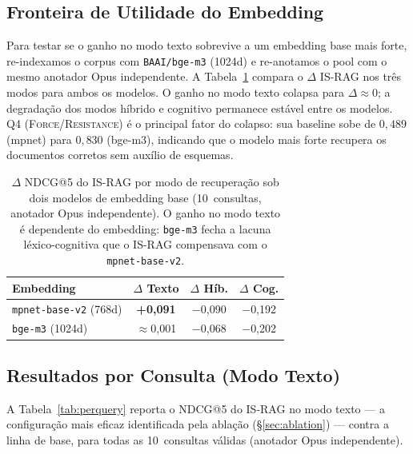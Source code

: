 \documentclass[11pt,a4paper]{article}
\begin{document}
\subsection{Fronteira de Utilidade do Embedding}
\label{sec:embedding}

Para testar se o ganho no modo texto sobrevive a um embedding base mais
forte, re-indexamos o corpus com \texttt{BAAI/bge-m3} (1024d) e
re-anotamos o pool com o mesmo anotador Opus independente.
A Tabela~\ref{tab:embedding} compara o $\Delta$ IS-RAG nos três modos
para ambos os modelos.
O ganho no modo texto colapsa para $\Delta \approx 0$; a degradação dos
modos híbrido e cognitivo permanece estável entre os modelos.
Q4 (\textsc{Force}/\textsc{Resistance}) é o principal fator do colapso:
sua baseline sobe de $0{,}489$ (mpnet) para $0{,}830$ (bge-m3),
indicando que o modelo mais forte recupera os documentos corretos sem
auxílio de esquemas.

\begin{table}[H]
\centering
\small
\setlength{\tabcolsep}{4pt}
\begin{tabular}{lccc}
\toprule
\textbf{Embedding} & \textbf{$\Delta$ Texto} & \textbf{$\Delta$ Híb.} & \textbf{$\Delta$ Cog.} \\
\midrule
\texttt{mpnet-base-v2} (768d) & \textbf{+0,091} & $-$0,090 & $-$0,192 \\
\texttt{bge-m3}        (1024d) & $\approx$0,001  & $-$0,068 & $-$0,202 \\
\bottomrule
\end{tabular}
\caption{$\Delta$ NDCG@5 do IS-RAG por modo de recuperação sob dois
  modelos de embedding base (10~consultas, anotador Opus independente).
  O ganho no modo texto é dependente do embedding: \texttt{bge-m3}
  fecha a lacuna léxico-cognitiva que o IS-RAG compensava com o
  \texttt{mpnet-base-v2}.}
\label{tab:embedding}
\end{table}

\subsection{Resultados por Consulta (Modo Texto)}

A Tabela~\ref{tab:perquery} reporta o NDCG@5 do IS-RAG no modo
texto — a configuração mais eficaz identificada pela ablação
(\S\ref{sec:ablation}) — contra a linha de base, para todas as
10~consultas válidas (anotador Opus independente).
\end{document}
